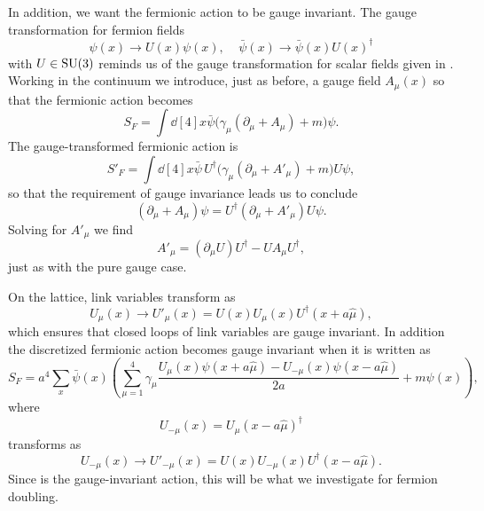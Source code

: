 In addition, we want the fermionic action to be gauge invariant. The
gauge transformation for fermion fields
\begin{equation}
  \psi(x)\to U(x)\psi(x),~~~~~\bar{\psi}(x)\to\bar{\psi}(x)U(x)^\dagger
\end{equation}
with $U\in\operatorname{SU}(3)$ reminds us of the gauge transformation for scalar 
fields given in . Working in the continuum 
we introduce, just as before, a gauge field $A_\mu(x)$ so that the 
fermionic action becomes
\begin{equation}
  S_F=\int\dd[4]{x}\bar{\psi}\big(\gamma_\mu(\partial_\mu+A_\mu)+m\big)\psi.
\end{equation}
The gauge-transformed fermionic action is
\begin{equation}
  S'_F=\int\dd[4]{x}\bar{\psi}\,U^\dagger
        \big(\gamma_\mu(\partial_\mu+A'_\mu)+m\big)U\psi,
\end{equation}
so that the requirement of gauge invariance leads us to conclude
\begin{equation}
  (\partial_\mu+A_\mu)\psi=U^\dagger(\partial_\mu+A'_\mu)U\psi.
\end{equation}
Solving for $A'_\mu$ we find
\begin{equation}
  A'_\mu=(\partial_\mu U)U^\dagger-UA_\mu U^\dagger,
\end{equation}
just as with the pure gauge case. 

On the lattice, link variables transform as
\begin{equation}
  U_\mu(x)\to U'_\mu(x)=U(x)U_\mu(x)U^\dagger(x+a\hat{\mu}),
\end{equation}
which ensures that closed loops of link variables are gauge invariant.
In addition the discretized fermionic action becomes gauge invariant
when it is written as
\begin{equation}\label{eq:naivefermactgauge}
  S_F=a^4\sum_x\bar{\psi}(x)\left(\sum_{\mu=1}^4\gamma_\mu
       \frac{U_\mu(x)\psi(x+a\hat{\mu})-U_{-\mu}(x)\psi(x-a\hat{\mu})}{2a}
       +m\psi(x)\right),
\end{equation}
where
\begin{equation}
  U_{-\mu}(x)=U_\mu(x-a\hat{\mu})^\dagger
\end{equation}
transforms as
\begin{equation}
  U_{-\mu}(x)\to U'_{-\mu}(x)=U(x)U_{-\mu}(x)U^\dagger(x-a\hat{\mu}).
\end{equation}
Since  is the gauge-invariant action,
this will be what we investigate for fermion doubling.

